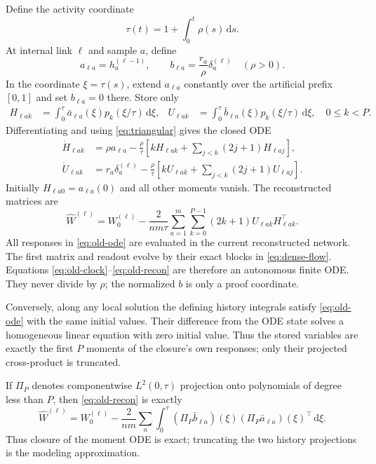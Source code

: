 \documentclass[11pt]{article}
\theoremstyle{definition}
\theoremstyle{remark}
\newcommand{\dd}{\,\mathrm{d}}
\begin{document}
Define the activity coordinate
\begin{equation}
 \tau(t)=1+\int_0^t\rho(s)\dd s.                    \label{eq:old-clock}
\end{equation}
At internal link $\ell$ and sample $a$, define
\[
 a_{\ell a}=h_a^{(\ell-1)},\qquad
 b_{\ell a}=\frac{r_a}{\rho}\delta_a^{(\ell)}\quad(\rho>0).
\]
In the coordinate $\xi=\tau(s)$, extend $a_{\ell a}$ constantly over the
artificial prefix $[0,1]$ and set $b_{\ell a}=0$ there.  Store only
\begin{align}
 H_{\ell ak}&=\int_0^\tau \bar a_{\ell a}(\xi)
 p_k(\xi/\tau)\dd\xi,&
 U_{\ell ak}&=\int_0^\tau \bar b_{\ell a}(\xi)
 p_k(\xi/\tau)\dd\xi,\quad 0\le k<P.               \label{eq:old-moments}
\end{align}
Differentiating and using \eqref{eq:triangular} gives the closed ODE
\begin{align}
 \dot H_{\ell ak}&=\rho a_{\ell a}-\frac{\rho}{\tau}
 \left[kH_{\ell ak}+\sum_{j<k}(2j+1)H_{\ell aj}\right],\nonumber\\
 \dot U_{\ell ak}&=r_a\delta_a^{(\ell)}-\frac{\rho}{\tau}
 \left[kU_{\ell ak}+\sum_{j<k}(2j+1)U_{\ell aj}\right]. \label{eq:old-ode}
\end{align}
Initially $H_{\ell a0}=a_{\ell a}(0)$ and all other moments vanish.  The
reconstructed matrices are
\begin{equation}
 \widehat W^{(\ell)}=W_0^{(\ell)}-\frac{2}{nm\tau}
 \sum_{a=1}^m\sum_{k=0}^{P-1}(2k+1)
 U_{\ell ak}H_{\ell ak}^\top.                       \label{eq:old-recon}
\end{equation}
All responses in \eqref{eq:old-ode} are evaluated in the current reconstructed
network.  The first matrix and readout evolve by their exact blocks in
\eqref{eq:dense-flow}.  Equations \eqref{eq:old-clock}--\eqref{eq:old-recon}
are therefore an autonomous finite ODE.  They never divide by $\rho$; the
normalized $b$ is only a proof coordinate.

Conversely, along any local solution the defining history integrals satisfy
\eqref{eq:old-ode} with the same initial values.  Their difference from the
ODE state solves a homogeneous linear equation with zero initial value.
Thus the stored variables are exactly the first $P$ moments of the closure's
own responses; only their projected cross-product is truncated.

If $\Pi_P$ denotes componentwise $L^2(0,\tau)$ projection onto polynomials of
degree less than $P$, then \eqref{eq:old-recon} is exactly
\begin{equation}
 \widehat W^{(\ell)}=W_0^{(\ell)}-\frac{2}{nm}\sum_a
 \int_0^\tau(\Pi_P\bar b_{\ell a})(\xi)
 (\Pi_P\bar a_{\ell a})(\xi)^\top\dd\xi.            \label{eq:projection-form}
\end{equation}
Thus closure of the moment ODE is exact; truncating the two history projections
is the modeling approximation.
\end{document}

